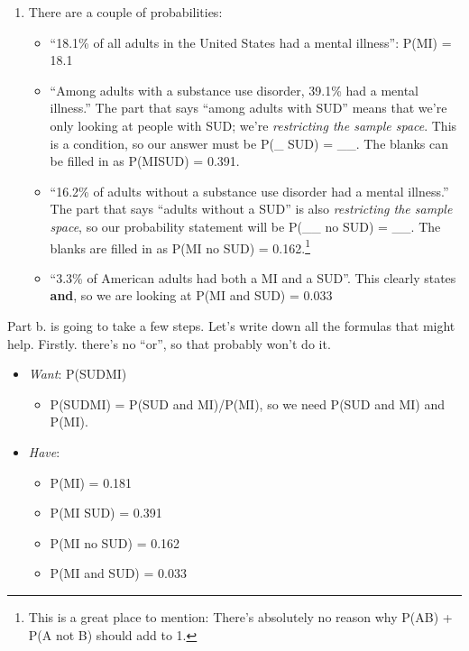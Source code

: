 \documentclass[
  letterpaper,
  DIV=11,
  numbers=noendperiod]{scrreprt}
\providecommand{\tightlist}{%
  \setlength{\itemsep}{0pt}\setlength{\parskip}{0pt}}\usepackage{longtable,booktabs,array}
\begin{document}
\begin{enumerate}
\def\labelenumi{\alph{enumi}.}
\tightlist
\item
  There are a couple of probabilities:

  \begin{itemize}
  \tightlist
  \item
    ``18.1\% of all adults in the United States had a mental illness'':
    P(MI) = 18.1
  \item
    ``Among adults with a substance use disorder, 39.1\% had a mental
    illness.'' The part that says ``among adults with SUD'' means that
    we're only looking at people with SUD; we're \emph{restricting the
    sample space}. This is a condition, so our answer must be P(\_
    \textbar{} SUD) = \_\_. The blanks can be filled in as
    P(MI\textbar SUD) = 0.391.
  \item
    ``16.2\% of adults without a substance use disorder had a mental
    illness.'' The part that says ``adults without a SUD'' is also
    \emph{restricting the sample space}, so our probability statement
    will be P(\_\_ \textbar{} no SUD) = \_\_. The blanks are filled in
    as P(MI \textbar{} no SUD) = 0.162.\footnote{This is a great place
      to mention: There's absolutely no reason why P(A\textbar B) +
      P(A\textbar{} not B) should add to 1.}
  \item
    ``3.3\% of American adults had both a MI and a SUD''. This clearly
    states \textbf{and}, so we are looking at P(MI and SUD) = 0.033
  \end{itemize}
\end{enumerate}

Part b. is going to take a few steps. Let's write down all the formulas
that might help. Firstly. there's no ``or'', so that probably won't do
it.

\begin{itemize}
\tightlist
\item
  \emph{Want}: P(SUD\textbar MI)

  \begin{itemize}
  \tightlist
  \item
    P(SUD\textbar MI) = P(SUD and MI)/P(MI), so we need P(SUD and MI)
    and P(MI).
  \end{itemize}
\item
  \emph{Have}:

  \begin{itemize}
  \tightlist
  \item
    P(MI) = 0.181
  \item
    P(MI \textbar{} SUD) = 0.391
  \item
    P(MI \textbar{} no SUD) = 0.162
  \item
    P(MI and SUD) = 0.033
  \end{itemize}
\end{itemize}
\end{document}
